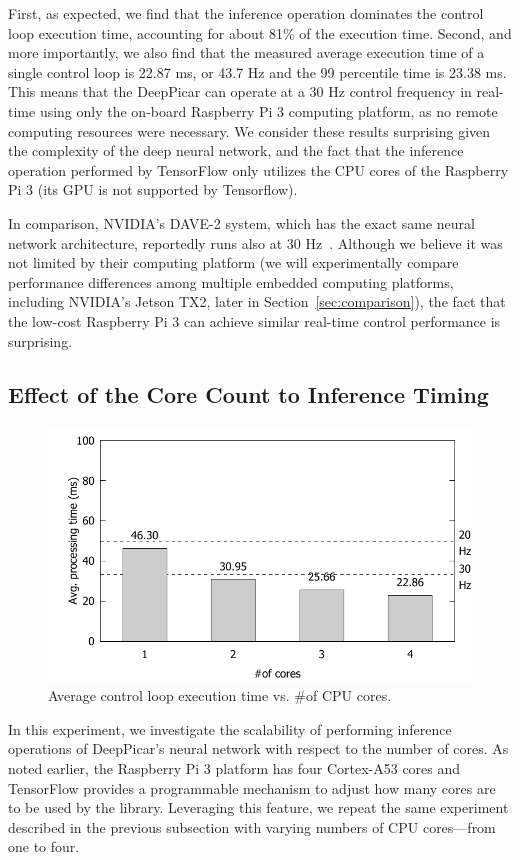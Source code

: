First, as expected, we find that the inference operation
dominates the control loop execution time, accounting for about 81\% of
the execution time.
Second, and more importantly, we also find that the measured average
execution time of a single control loop is 22.87 ms, or 43.7 Hz and
the 99 percentile time is 23.38 ms.
This means that the DeepPicar can operate
at a 30 Hz control frequency in real-time using only the on-board
Raspberry Pi 3 computing platform, as no remote computing resources 
were necessary. We consider these results surprising given the complexity
of the deep neural network, and the fact that the inference operation
performed by TensorFlow only utilizes the CPU cores of the
Raspberry Pi 3 (its GPU is not supported by Tensorflow).

In comparison, NVIDIA's DAVE-2 system, which has the exact same neural
network architecture, reportedly runs also at 30 Hz~\cite{Bojarski2016}. 
Although we believe it was not
limited by their computing platform (we will experimentally compare
performance differences among multiple embedded computing platforms,
including NVIDIA's Jetson TX2, later in
Section~\ref{sec:comparison}), the fact that the low-cost
Raspberry Pi 3 can achieve similar real-time control performance is
surprising.

\subsection{Effect of the Core Count to Inference Timing}

\begin{figure}[h]
  \centering
  \includegraphics[width=.7\textwidth]{figs/perf_vs_corecnt}
  \caption{Average control loop execution time vs. \#of CPU
    cores.}
  \label{fig:perf-vs-corecnt}
\end{figure}

In this experiment, we investigate the scalability of performing
inference operations of DeepPicar's neural network with respect to the
number of cores. As noted earlier, the Raspberry Pi 3 platform has
four Cortex-A53 cores and TensorFlow 
provides a programmable mechanism to adjust how many cores are to be
used by the library. Leveraging this feature, we repeat the
same experiment described in the previous subsection with varying
numbers of CPU cores---from one to four.

